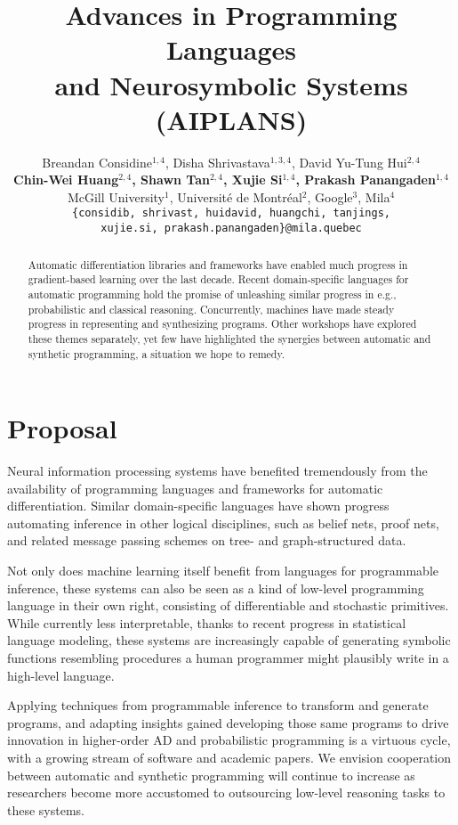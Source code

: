 \documentclass{article}
\title{Advances in Programming Languages\\ and Neurosymbolic Systems (AIPLANS)}
\author{%
    Breandan Considine$^{1, 4}$, Disha Shrivastava$^{1, 3, 4}$, David Yu-Tung Hui$^{2, 4}$ \\
    \textbf{Chin-Wei Huang$^{2, 4}$, Shawn Tan$^{2, 4}$, Xujie Si$^{1, 4}$, Prakash Panangaden$^{1, 4}$} \\
    McGill University$^1$, Universit\'e de Montr\'eal$^2$, Google$^3$, Mila$^4$ \\
    \texttt{\{considib, shrivast, huidavid, huangchi, tanjings,}\\
    \texttt{xujie.si, prakash.panangaden\}@mila.quebec} \\
}
\begin{document}
    \maketitle

    \begin{abstract}
        Automatic differentiation libraries and frameworks have enabled much progress in gradient-based learning over the last decade. Recent domain-specific languages for automatic programming hold the promise of unleashing similar progress in e.g., probabilistic and classical reasoning. Concurrently, machines have made steady progress in representing and synthesizing programs. Other workshops have explored these themes separately, yet few have highlighted the synergies between automatic and synthetic programming, a situation we hope to remedy.
    \end{abstract}


    \section{Proposal}

    Neural information processing systems have benefited tremendously from the availability of programming languages and frameworks for automatic differentiation. Similar domain-specific languages have shown progress automating inference in other logical disciplines, such as belief nets, proof nets, and related message passing schemes on tree- and graph-structured data.

    Not only does machine learning itself benefit from languages for programmable inference, these systems can also be seen as a kind of low-level programming language in their own right, consisting of differentiable and stochastic primitives. While currently less interpretable, thanks to recent progress in statistical language modeling, these systems are increasingly capable of generating symbolic functions resembling procedures a human programmer might plausibly write in a high-level language.

    Applying techniques from programmable inference to transform and generate programs, and adapting insights gained developing those same programs to drive innovation in higher-order AD and probabilistic programming is a virtuous cycle, with a growing stream of software and academic papers. We envision cooperation between automatic and synthetic programming will continue to increase as researchers become more accustomed to outsourcing low-level reasoning tasks to these systems.
\end{document}
